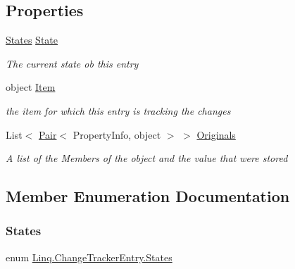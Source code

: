 \subsection*{Properties}
\begin{DoxyCompactItemize}
\item 
\mbox{\hyperlink{class_linq_1_1_change_tracker_entry_aded3f97a3bd1326ae1b264c7618b7828}{States}} \mbox{\hyperlink{class_linq_1_1_change_tracker_entry_ad24e8722ffd29eccfdcd3a72c97b1957}{State}}
\begin{DoxyCompactList}\small\item\em The current state ob this entry \end{DoxyCompactList}\item 
object \mbox{\hyperlink{class_linq_1_1_change_tracker_entry_a9286918528bb182197ebc21d391bbcf2}{Item}}
\begin{DoxyCompactList}\small\item\em the item for which this entry is tracking the changes \end{DoxyCompactList}\item 
List$<$ \mbox{\hyperlink{class_linq_1_1_change_tracker_entry_1_1_pair}{Pair}}$<$ Property\+Info, object $>$ $>$ \mbox{\hyperlink{class_linq_1_1_change_tracker_entry_abb117792a18f0df8424ba7617e317e1e}{Originals}}
\begin{DoxyCompactList}\small\item\em A list of the Members of the object and the value that were stored \end{DoxyCompactList}\end{DoxyCompactItemize}


\subsection{Member Enumeration Documentation}
\mbox{\label{class_linq_1_1_change_tracker_entry_aded3f97a3bd1326ae1b264c7618b7828}} 
\subsubsection{\texorpdfstring{States}{States}}
{\footnotesize\ttfamily enum \mbox{\hyperlink{class_linq_1_1_change_tracker_entry_aded3f97a3bd1326ae1b264c7618b7828}{Linq.\+Change\+Tracker\+Entry.\+States}}\hspace{0.3cm}{\ttfamily [strong]}}



